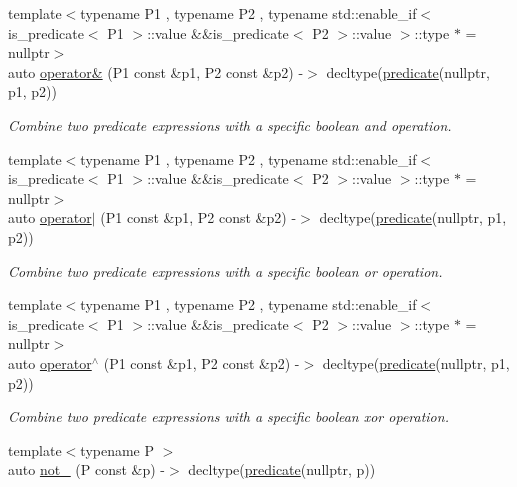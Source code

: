 \begin{DoxyCompactItemize}
\item 
{\footnotesize template$<$typename P1 , typename P2 , typename std\+::enable\+\_\+if$<$ is\+\_\+predicate$<$ P1 $>$\+::value \&\&is\+\_\+predicate$<$ P2 $>$\+::value $>$\+::type $\ast$  = nullptr$>$ }\\auto \hyperlink{namespacepfq_1_1lang_af24d9c3092f064b0732a4b601dde2c64}{operator\&} (P1 const \&p1, P2 const \&p2) -\/$>$ decltype(\hyperlink{namespacepfq_1_1lang_aca9adafc436b7f851621b979fa1aaf88}{predicate}(nullptr, p1, p2))
\begin{DoxyCompactList}\small\item\em Combine two predicate expressions with a specific boolean \textquotesingle{}and\textquotesingle{} operation. \end{DoxyCompactList}\item 
{\footnotesize template$<$typename P1 , typename P2 , typename std\+::enable\+\_\+if$<$ is\+\_\+predicate$<$ P1 $>$\+::value \&\&is\+\_\+predicate$<$ P2 $>$\+::value $>$\+::type $\ast$  = nullptr$>$ }\\auto \hyperlink{namespacepfq_1_1lang_a425bb535884185450da7addcdb47f35b}{operator$\vert$} (P1 const \&p1, P2 const \&p2) -\/$>$ decltype(\hyperlink{namespacepfq_1_1lang_aca9adafc436b7f851621b979fa1aaf88}{predicate}(nullptr, p1, p2))
\begin{DoxyCompactList}\small\item\em Combine two predicate expressions with a specific boolean \textquotesingle{}or\textquotesingle{} operation. \end{DoxyCompactList}\item 
{\footnotesize template$<$typename P1 , typename P2 , typename std\+::enable\+\_\+if$<$ is\+\_\+predicate$<$ P1 $>$\+::value \&\&is\+\_\+predicate$<$ P2 $>$\+::value $>$\+::type $\ast$  = nullptr$>$ }\\auto \hyperlink{namespacepfq_1_1lang_aa6692a978788617acebfee6ded6ebbbc}{operator$^\wedge$} (P1 const \&p1, P2 const \&p2) -\/$>$ decltype(\hyperlink{namespacepfq_1_1lang_aca9adafc436b7f851621b979fa1aaf88}{predicate}(nullptr, p1, p2))
\begin{DoxyCompactList}\small\item\em Combine two predicate expressions with a specific boolean \textquotesingle{}xor\textquotesingle{} operation. \end{DoxyCompactList}\item 
{\footnotesize template$<$typename P $>$ }\\auto \hyperlink{namespacepfq_1_1lang_aad91ae49c0ddea5a9219f679e8de212a}{not\+\_\+} (P const \&p) -\/$>$ decltype(\hyperlink{namespacepfq_1_1lang_aca9adafc436b7f851621b979fa1aaf88}{predicate}(nullptr, p))

\end{DoxyCompactItemize}
